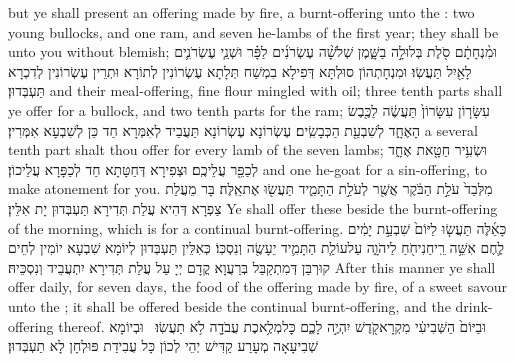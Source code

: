 {but ye shall present an offering made by fire, a burnt-offering unto the \lord: two young bullocks, and one ram, and seven he-lambs of the first year; they shall be unto you without blemish;}{}
{וּמִ֨נְחָתָ֔ם סֹ֖לֶת בְּלוּלָ֣ה בַשָּׁ֑מֶן שְׁלֹשָׁ֨ה עֶשְׂרֹנִ֜ים לַפָּ֗ר וּשְׁנֵ֧י עֶשְׂרֹנִ֛ים לָאַ֖יִל תַּעֲשֽׂוּ׃}
{וּמִנְחָתְהוֹן סוּלְתָּא דְּפִילָא בִמְשַׁח תְּלָתָא עֶשְׂרוֹנִין לְתוֹרָא וּתְרֵין עֶשְׂרוֹנִין לְדִכְרָא תַּעְבְּדוּן׃}
{and their meal-offering, fine flour mingled with oil; three tenth parts shall ye offer for a bullock, and two tenth parts for the ram;}{}
{עִשָּׂר֤וֹן עִשָּׂרוֹן֙ תַּעֲשֶׂ֔ה לַכֶּ֖בֶשׂ הָאֶחָ֑ד לְשִׁבְעַ֖ת הַכְּבָשִֽׂים׃}
{עֶשְׂרוֹנָא עֶשְׂרוֹנָא תַּעֲבֵיד לְאִמְּרָא חַד כֵּן לְשִׁבְעָא אִמְּרִין׃}
{a several tenth part shalt thou offer for every lamb of the seven lambs;}{}
{וּשְׂעִ֥יר חַטָּ֖את אֶחָ֑ד לְכַפֵּ֖ר עֲלֵיכֶֽם׃}
{וּצְפִירָא דְּחַטָּתָא חַד לְכַפָּרָא עֲלֵיכוֹן׃}
{and one he-goat for a sin-offering, to make atonement for you.}{}
{מִלְּבַד֙ עֹלַ֣ת הַבֹּ֔קֶר אֲשֶׁ֖ר לְעֹלַ֣ת הַתָּמִ֑יד תַּעֲשׂ֖וּ אֶת\maqqaf אֵֽלֶּה׃}
{בָּר מֵעֲלַת צַפְרָא דְּהִיא עֲלַת תְּדִירָא תַּעְבְּדוּן יָת אִלֵּין׃}
{Ye shall offer these beside the burnt-offering of the morning, which is for a continual burnt-offering.}{}
{כָּאֵ֜לֶּה תַּעֲשׂ֤וּ לַיּוֹם֙ שִׁבְעַ֣ת יָמִ֔ים לֶ֛חֶם אִשֵּׁ֥ה רֵֽיחַ\maqqaf נִיחֹ֖חַ לַיהֹוָ֑ה עַל\maqqaf עוֹלַ֧ת הַתָּמִ֛יד יֵעָשֶׂ֖ה וְנִסְכּֽוֹ׃}
{כְּאִלֵּין תַּעְבְּדוּן לְיוֹמָא שִׁבְעָא יוֹמִין לְחֵים קוּרְבַּן דְּמִתְקַבַּל בְּרַעֲוָא קֳדָם יְיָ עַל עֲלַת תְּדִירָא יִתְעֲבֵיד וְנִסְכֵּיהּ׃}
{After this manner ye shall offer daily, for seven days, the food of the offering made by fire, of a sweet savour unto the \lord; it shall be offered beside the continual burnt-offering, and the drink-offering thereof.}{}
{וּבַיּוֹם֙ הַשְּׁבִיעִ֔י מִקְרָא\maqqaf קֹ֖דֶשׁ יִהְיֶ֣ה לָכֶ֑ם כׇּל\maqqaf מְלֶ֥אכֶת עֲבֹדָ֖ה לֹ֥א תַעֲשֽׂוּ׃ \setuma }
{וּבְיוֹמָא שְׁבִיעָאָה מְעָרַע קַדִּישׁ יְהֵי לְכוֹן כָּל עֲבִידַת פּוּלְחָן לָא תַעְבְּדוּן׃}
